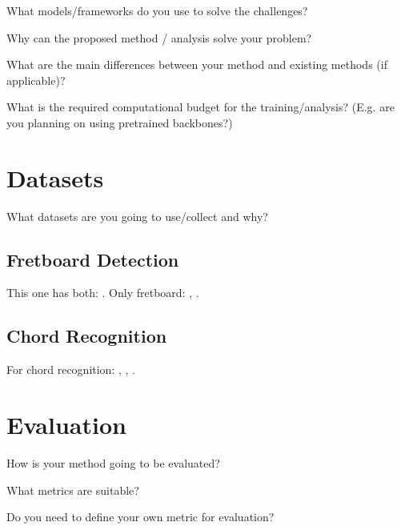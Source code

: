 \documentclass[10pt,twocolumn,letterpaper]{article}
\begin{document}
What models/frameworks do you use to solve the challenges?

Why can the proposed method / analysis solve your problem?

What are the main differences between your method and existing methods (if applicable)?

What is the required computational budget for the training/analysis? (E.g. are you planning on using pretrained backbones?)

\section{Datasets}

What datasets are you going to use/collect and why?


\subsection{Fretboard Detection}
This one has both: \cite{guitar-chords-daewp_dataset}. 
Only fretboard: \cite{guitar-ppfil_dataset}, \cite{done-npcll_dataset}.

\subsection{Chord Recognition}
For chord recognition: \cite{guitar-chord-tvon8_dataset}, \cite{guitar-chord-bounding-box_dataset}, \cite{guitar-chord-handshape_dataset}.

\section{Evaluation}

How is your method going to be evaluated?

What metrics are suitable?

Do you need to define your own metric for evaluation?

\clearpage 

{\small


}
\end{document}
